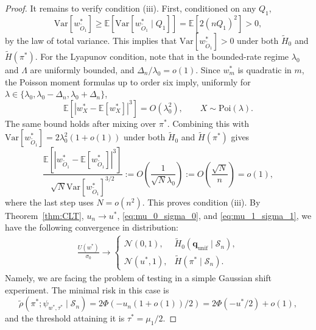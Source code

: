 \documentclass[11pt]{article}
\numberwithin{equation}{section}
\newcommand{\unif}{\mathrm{unif}}
\newcommand{\Pois}{\mathrm{Poi}}
\newcommand{\Scal}{\mathcal{S}}
\newcommand{\Ncal}{\mathcal{N}}
\newcommand{\Var}[1]{\mathrm{Var}\left[ #1\right]}
\newcommand{\ex}[1]{\ensuremath{\mathbb{E}\left[ #1\right]}}
\begin{document}
\begin{proof}
It remains to verify condition (iii). First, conditioned on any $Q_1$,
\[
\Var{w^*_{\tilde{O}_1}} \geq \ex{\Var{w^*_{\tilde{O}_1}\mid Q_1}}
=\ex{2(nQ_1)^2}>0,
\]
by the law of total variance. This implies that $\Var{w^*_{\tilde{O}_1}}>0$ under both $\tilde{H}_0$ and $\tilde{H}(\pi^*)$. For the Lyapunov condition, note that in the bounded-rate regime $\lambda_0$ and $\Lambda$ are uniformly bounded, and $\Delta_n/\lambda_0=o(1)$. Since $w_m^*$ is quadratic in $m$, the Poisson moment formulas up to order six imply, uniformly for $\lambda\in\{\lambda_0,\lambda_0-\Delta_n,\lambda_0+\Delta_n\}$,
\[
\ex{\left|w_X^*-\ex{w_X^*}\right|^3}=O(\lambda_0^2),\qquad X\sim\Pois(\lambda).
\]
The same bound holds after mixing over $\pi^*$. Combining this with
$\Var{w^*_{\tilde{O}_1}}=2\lambda_0^2(1+o(1))$ under both $\tilde{H}_0$ and $\tilde{H}(\pi^*)$ gives
\[
\frac{\ex{\left|w^*_{\tilde{O}_1}
-\ex{w^*_{\tilde{O}_1}}\right|^3}}
{\sqrt{N}\Var{w^*_{\tilde{O}_1}}^{3/2}}
:=O\left(\frac{1}{\sqrt{N}\lambda_0}\right)
:=O\left(\frac{\sqrt{N}}{n}\right)=o(1),
\]
where the last step uses $N=o(n^2)$. This proves condition (iii).
By Theorem~\ref{thm:CLT}, $u_n \to u^*$, \eqref{eq:mu_0_sigma_0}, and \eqref{eq:mu_1_sigma_1}, we have the following convergence in distribution:
\begin{align}
    \label{eq:CLT_result}
    \frac{U(w^*)}{\sigma_0}  \to \begin{cases}
        \Ncal(0,1), & \tilde{H}_0(\mathbf{q}_{\unif} \mid \Scal_n), \\
        \Ncal(u^*,1), & \tilde{H}(\pi^* \mid \Scal_n).
    \end{cases}
\end{align}
Namely, we are facing the problem of testing in a simple Gaussian shift experiment. The minimal risk in this case is 
\[
\tilde{\rho}(\pi^*; \psi_{w^*,\tau^*} \mid \Scal_n) = 2\Phi(-u_n(1+o(1))/2) = 2\Phi(-u^*/2) + o(1),
\]
and the threshold attaining it is $\tau^* = \mu_1 / 2$.
\end{proof}
\end{document}

